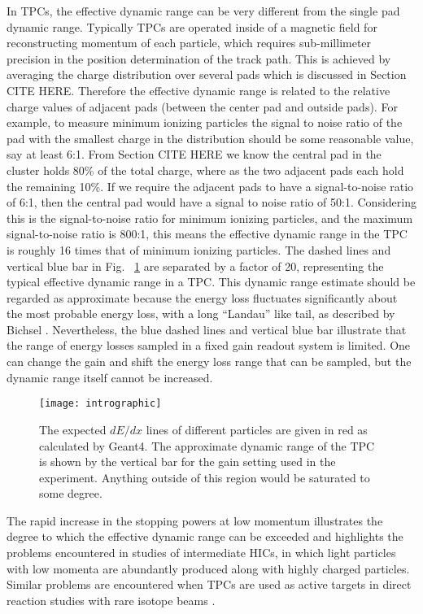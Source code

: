In TPCs, the effective dynamic range can be very different from the single pad dynamic range. Typically TPCs are operated inside of a magnetic field for reconstructing momentum of each particle, which requires sub-millimeter precision in the position determination of the track path. This is achieved by averaging the charge distribution over several pads which is discussed in Section CITE HERE. Therefore the effective dynamic range is related to the relative charge values of adjacent pads (between the center pad and outside pads). For example, to measure minimum ionizing particles the signal to noise ratio of the pad with the smallest charge in the distribution should be some reasonable value, say at least 6:1. From Section CITE HERE we know the central pad in the cluster holds 80\% of the total charge, where as the two adjacent pads each hold the remaining 10\%. If we require the adjacent pads to have a signal-to-noise ratio of 6:1, then the central pad would have a signal to noise ratio of 50:1. Considering this is the signal-to-noise ratio for minimum ionizing particles, and the maximum signal-to-noise ratio is 800:1, this means the effective dynamic range in the TPC is roughly 16 times that of minimum ionizing particles. The dashed lines and vertical blue bar in Fig.~ \ref{fig:intro} are separated by a factor of 20, representing the typical effective dynamic range in a TPC. This dynamic range estimate should be regarded as approximate because the energy loss fluctuates significantly about the most probable energy loss, with a long ``Landau'' like tail, as described by Bichsel \cite{bichsel}. Nevertheless, the blue dashed lines and vertical blue bar illustrate that the range of energy losses sampled in a fixed gain readout system is limited. One can change the gain and shift the energy loss range that can be sampled, but the dynamic range itself cannot be increased.

  
\begin{figure}[ht!]
\texttt{[image: intrographic]}
\caption{The expected $dE/dx$ lines of different particles are given in red as calculated by Geant4. The approximate dynamic range of the TPC is shown by the vertical bar for the gain setting used in the experiment. Anything outside of this region would be saturated to some degree.}
\label{fig:intro}
\end{figure}

The rapid increase in the stopping powers at low momentum illustrates the degree to which the effective dynamic range can be exceeded and highlights the problems encountered in studies of intermediate HICs, in which light particles with low momenta are abundantly produced along with highly charged particles. Similar problems are encountered when TPCs are used as active targets in direct reaction studies with rare isotope beams \cite{pattpc}. 

